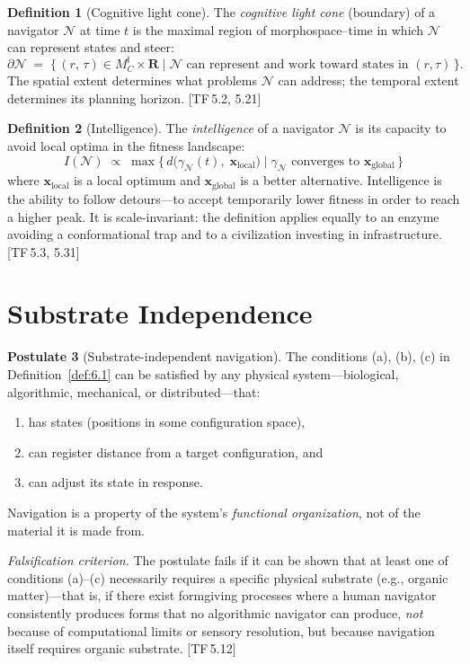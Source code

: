 \documentclass[10pt]{article}
\theoremstyle{definition}
\newtheorem{definition}{Definition}[section]
\newtheorem{postulate}[definition]{Postulate}
\theoremstyle{plain}
\theoremstyle{remark}
\newcommand{\MC}{M^{\mathsf{I}}_C}          %
\providecommand{\R}{}
\renewcommand{\R}{\mathbf{R}}               %
\newcommand{\Nav}{\mathcal{N}}               %
\newcommand{\TF}[1]{\textnormal{[TF\,#1]}}  %
\begin{document}
\begin{definition}[Cognitive light cone]\label{def:6.2}
The \emph{cognitive light cone} (boundary) of a navigator $\Nav$ at
time $t$ is the maximal region of morphospace--time in which $\Nav$ can
represent states and steer:
\[
  \partial\Nav \;=\;
  \bigl\{\, (r,\, \tau) \in \MC \times \R
    \;\big|\;
    \Nav \text{ can represent and work toward states in } (r, \tau)
  \,\bigr\}.
\]
The spatial extent determines what problems $\Nav$ can address; the
temporal extent determines its planning horizon. \TF{5.2, 5.21}
\end{definition}

\begin{definition}[Intelligence]\label{def:6.3}
The \emph{intelligence} of a navigator $\Nav$ is its capacity to avoid
local optima in the fitness landscape:
\[
  I(\Nav) \;\propto\;
  \max\bigl\{\, d\bigl(\gamma_\Nav(t),\; \bm{x}_{\mathrm{local}}\bigr)
    \;\big|\;
    \gamma_\Nav \text{ converges to } \bm{x}_{\mathrm{global}}
  \,\bigr\}
\]
where $\bm{x}_{\mathrm{local}}$ is a local optimum and
$\bm{x}_{\mathrm{global}}$ is a better alternative.
Intelligence is the ability to follow detours---to accept temporarily
lower fitness in order to reach a higher peak. It is scale-invariant:
the definition applies equally to an enzyme avoiding a conformational
trap and to a civilization investing in infrastructure. \TF{5.3, 5.31}
\end{definition}


\newpage
\section{Substrate Independence}\label{sec:substrate}

\begin{postulate}[Substrate-independent navigation]\label{post:7.1}
The conditions (a), (b), (c) in Definition~\ref{def:6.1} can be
satisfied by any physical system---biological, algorithmic, mechanical,
or distributed---that:
\begin{enumerate}[label=(\roman*),nosep]
  \item has states (positions in some configuration space),
  \item can register distance from a target configuration, and
  \item can adjust its state in response.
\end{enumerate}
Navigation is a property of the system's \emph{functional organization},
not of the material it is made from.

\medskip\noindent
\textit{Falsification criterion.}
The postulate fails if it can be shown that at least one of conditions
(a)--(c) necessarily requires a specific physical substrate (e.g.,
organic matter)---that is, if there exist formgiving processes where a
human navigator consistently produces forms that no algorithmic navigator
can produce, \emph{not} because of computational limits or sensory
resolution, but because navigation itself requires organic substrate.
\TF{5.12}
\end{postulate}
\end{document}

